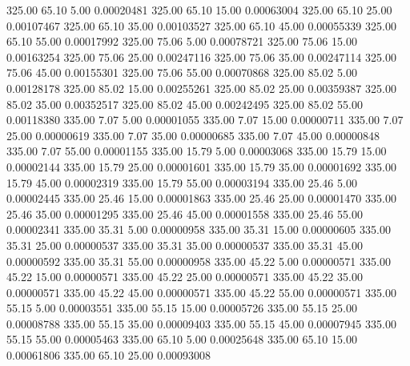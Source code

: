     325.00     65.10      5.00     0.00020481
    325.00     65.10     15.00     0.00063004
    325.00     65.10     25.00     0.00107467
    325.00     65.10     35.00     0.00103527
    325.00     65.10     45.00     0.00055339
    325.00     65.10     55.00     0.00017992
    325.00     75.06      5.00     0.00078721
    325.00     75.06     15.00     0.00163254
    325.00     75.06     25.00     0.00247116
    325.00     75.06     35.00     0.00247114
    325.00     75.06     45.00     0.00155301
    325.00     75.06     55.00     0.00070868
    325.00     85.02      5.00     0.00128178
    325.00     85.02     15.00     0.00255261
    325.00     85.02     25.00     0.00359387
    325.00     85.02     35.00     0.00352517
    325.00     85.02     45.00     0.00242495
    325.00     85.02     55.00     0.00118380
    335.00      7.07      5.00     0.00001055
    335.00      7.07     15.00     0.00000711
    335.00      7.07     25.00     0.00000619
    335.00      7.07     35.00     0.00000685
    335.00      7.07     45.00     0.00000848
    335.00      7.07     55.00     0.00001155
    335.00     15.79      5.00     0.00003068
    335.00     15.79     15.00     0.00002144
    335.00     15.79     25.00     0.00001601
    335.00     15.79     35.00     0.00001692
    335.00     15.79     45.00     0.00002319
    335.00     15.79     55.00     0.00003194
    335.00     25.46      5.00     0.00002445
    335.00     25.46     15.00     0.00001863
    335.00     25.46     25.00     0.00001470
    335.00     25.46     35.00     0.00001295
    335.00     25.46     45.00     0.00001558
    335.00     25.46     55.00     0.00002341
    335.00     35.31      5.00     0.00000958
    335.00     35.31     15.00     0.00000605
    335.00     35.31     25.00     0.00000537
    335.00     35.31     35.00     0.00000537
    335.00     35.31     45.00     0.00000592
    335.00     35.31     55.00     0.00000958
    335.00     45.22      5.00     0.00000571
    335.00     45.22     15.00     0.00000571
    335.00     45.22     25.00     0.00000571
    335.00     45.22     35.00     0.00000571
    335.00     45.22     45.00     0.00000571
    335.00     45.22     55.00     0.00000571
    335.00     55.15      5.00     0.00003551
    335.00     55.15     15.00     0.00005726
    335.00     55.15     25.00     0.00008788
    335.00     55.15     35.00     0.00009403
    335.00     55.15     45.00     0.00007945
    335.00     55.15     55.00     0.00005463
    335.00     65.10      5.00     0.00025648
    335.00     65.10     15.00     0.00061806
    335.00     65.10     25.00     0.00093008
